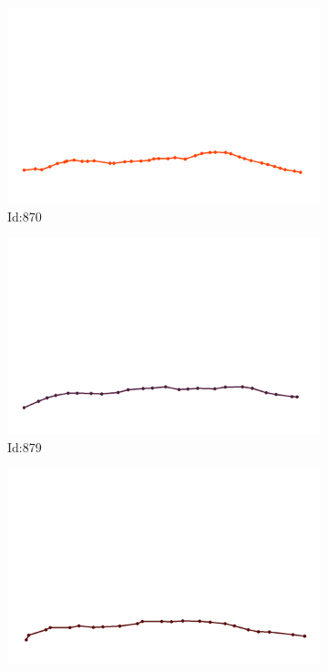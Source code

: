 \documentclass[12pt,twoside]{report}
\begin{document}
\begin{figure}
\begin{subfigure}[b]{0.20\textwidth}
\centering
\includegraphics[width=\textwidth]{../trajectories/870.png}
\caption{Id:870}
\end{subfigure}
\begin{subfigure}[b]{0.20\textwidth}
\centering
\includegraphics[width=\textwidth]{../trajectories/879.png}
\caption{Id:879}
\end{subfigure}
\begin{subfigure}[b]{0.20\textwidth}
\centering
\includegraphics[width=\textwidth]{../trajectories/883.png}

\end{subfigure}
\end{figure}
\end{document}
